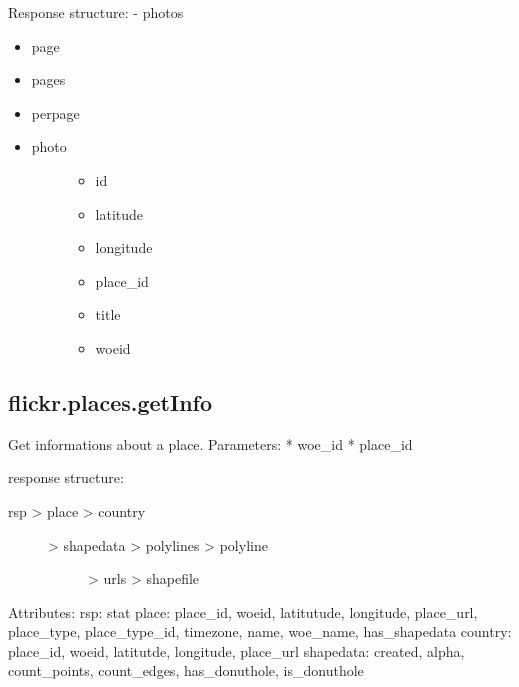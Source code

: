 \documentclass[letterpaper,10pt,english]{sphinxmanual}
\begin{document}
Response structure:
- photos
\begin{itemize}
\item {} 
page

\item {} 
pages

\item {} 
perpage

\item {} \begin{description}
\item[{photo}] \leavevmode\begin{itemize}
\item {} 
id

\item {} 
latitude

\item {} 
longitude

\item {} 
place\_id

\item {} 
title

\item {} 
woeid

\end{itemize}

\end{description}

\end{itemize}


\subsection{flickr.places.getInfo}
\label{flickr:flickr-places-getinfo}
Get informations about a place.
Parameters:
* woe\_id
* place\_id

response structure:
\begin{description}
\item[{rsp \textgreater{} place \textgreater{} country}] \leavevmode\begin{description}
\item[{\textgreater{} shapedata \textgreater{} polylines \textgreater{} polyline}] \leavevmode
\textgreater{} urls \textgreater{} shapefile

\end{description}

\end{description}

Attributes:
rsp: stat
place: place\_id, woeid, latitutude, longitude, place\_url, place\_type, place\_type\_id, timezone, name, woe\_name, has\_shapedata
country: place\_id, woeid, latitutde, longitude, place\_url
shapedata: created, alpha, count\_points, count\_edges, has\_donuthole, is\_donuthole
\end{document}
